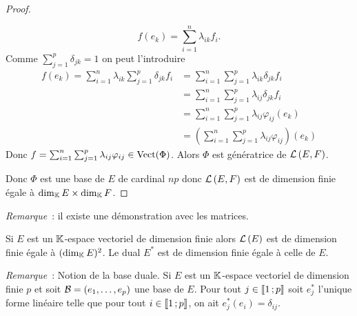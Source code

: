 \begin{proof}
\begin{enumerate}
    \begin{equation}
      f(e_k)= \sum_{i=1}^n \lambda_{ik} f_i.
    \end{equation}
    Comme \(\sum_{j=1}^p \delta_{jk}=1\) on peut l'introduire
    \begin{align}
      f(e_k) = \sum_{i=1}^n \lambda_{ik} \sum_{j=1}^p \delta_{jk} f_i &= \sum_{i=1}^n \sum_{j=1}^p \lambda_{ik} \delta_{jk} f_i \\
      &=\sum_{i=1}^n \sum_{j=1}^p \lambda_{ij} \delta_{jk} f_i\\
      &=\sum_{i=1}^n \sum_{j=1}^p \lambda_{ij} \varphi_{ij}(e_k)\\
      &=\left(\sum_{i=1}^n \sum_{j=1}^p \lambda_{ij} \varphi_{ij}\right)(e_k)
    \end{align}
    Donc \(f=\sum_{i=1}^n \sum_{j=1}^p \lambda_{ij} \varphi_{ij} \in \operatorname{Vect}(\Phi)\). Alors \(\Phi\) est génératrice de \(\mathcal{L}\left(E,F\right)\).
  \end{enumerate}
  Donc \(\Phi\) est une base de \(E\) de cardinal \(np\) donc \(\mathcal{L}\left(E,F\right)\) est de dimension finie égale à \(\operatorname{dim}_{\mathbb{K}} E \times \operatorname{dim}_{\mathbb{K}} F\).
\end{proof}

\emph{Remarque}~: il existe une démonstration avec les matrices.

\begin{corth}
  Si \(E\) est un \(\mathbb{K}\)-espace vectoriel de dimension finie alors \(\mathcal{L}\left(E\right)\) est de dimension finie égale à \((\operatorname{dim}_{\mathbb{K}} E)^2\). Le dual \(E^*\) est de dimension finie égale à celle de \(E\).
\end{corth}

\emph{Remarque}~: Notion de la base duale. Si \(E\) est un \(\mathbb{K}\)-espace vectoriel de dimension finie \(p\) et soit \(\mathcal{B}=(e_1, \ldots, e_p)\) une base de \(E\). Pour tout \(j \in  \mathopen{\llbracket}1\mathclose{}\mathpunct{};p\mathclose{\rrbracket}\) soit \(e_j^*\) l'unique forme linéaire telle que pour tout \(i \in  \mathopen{\llbracket}1\mathclose{}\mathpunct{};p\mathclose{\rrbracket}\), on ait \(e_j^*(e_i)=\delta_{ij}\).

